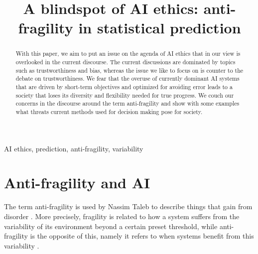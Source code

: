 \documentclass[conference]{IEEEtran}
\begin{document}
\title{A blindspot of AI ethics: anti-fragility in statistical prediction 
}%

\author{
\and
{}
}

\maketitle

\begin{abstract}
With this paper, we aim to put an issue on the agenda of AI ethics that in our view is overlooked in the current discourse. The current discussions are dominated by topics such as trustworthiness and bias, whereas the issue we like to focus on is counter to the debate on trustworthiness. We fear that the overuse of currently dominant AI systems that are driven by short-term objectives and optimized for avoiding error leads to a society that loses its diversity and flexibility needed for true progress. We couch our concerns in the discourse around the term anti-fragility and show with some examples what threats current methods used for decision making pose for society.  
\end{abstract}

\begin{IEEEkeywords}
AI ethics, prediction, anti-fragility, variability
\end{IEEEkeywords}

\section{Anti-fragility and AI}

The term anti-fragility is used by Nassim Taleb to describe things that gain from disorder \cite{Taleb:Antifragility:2012}. More precisely, fragility is related to how a system suffers from the variability of its environment beyond a certain preset threshold, while anti-fragility is the opposite of this, namely it refers to when systems benefit from this variability \cite{TalebDouady:Mathematical:2013}.
\end{document}
